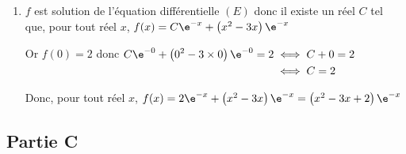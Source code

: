 \begin{enumerate}
		\item $f$ est solution de l'équation différentielle $(E)$  donc il existe un réel $C$ tel que, pour tout réel $x$, $f(x) = C\e^{-x} +\left(  x^2-3x \right) \e^{-x}$

		Or $f(0)=2$ donc $\begin{aligned}[t] C\e^{-0} +\left(  0^2-3\times 0 \right) \e^{-0} = 2 &\iff C + 0=2 \\
			&\iff C=2 \end{aligned}$

		Donc, pour tout réel $x$, $f(x) = 2\e^{-x} +\left(  x^2- 3x \right) \e^{-x} = \left(x^{2}-3 x+2\right)\e^{-x}$

	\end{enumerate}

	\subsection*{Partie C}

